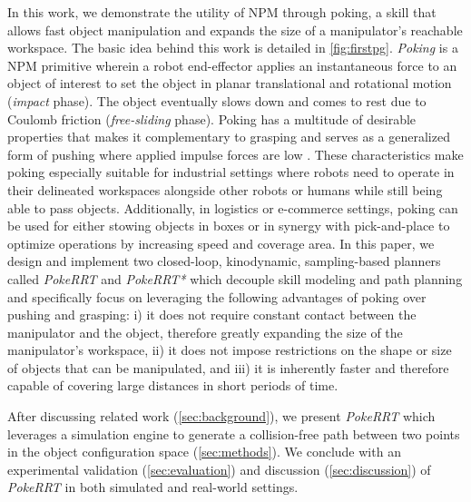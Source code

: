 In this work, we demonstrate the utility of NPM through poking, a skill that allows fast object manipulation and expands the size of a manipulator's reachable workspace. The basic idea behind this work is detailed in \cref{fig:firstpg}.
\textsl{Poking} is a NPM primitive wherein a robot end-effector applies an instantaneous force to an object of interest to set the object in planar translational and rotational motion (\textsl{impact} phase). The object eventually slows down and comes to rest due to Coulomb friction (\textsl{free-sliding} phase). Poking has a multitude of desirable properties that makes it complementary to grasping and serves as a generalized form of pushing where applied impulse forces are low \cite{Huang-1997-14452, pasricha2021pokerrt}. 
These characteristics make poking especially suitable for industrial settings where robots need to operate in their delineated workspaces alongside other robots or humans while still being able to pass objects. Additionally, in logistics or e-commerce settings, poking can be used for either stowing objects in boxes or in synergy with pick-and-place to optimize operations by increasing speed and coverage area.
In this paper, we design and implement two closed-loop, kinodynamic, sampling-based planners called \textsl{PokeRRT} and \textsl{PokeRRT*} which decouple skill modeling and path planning and specifically focus on leveraging the following advantages of poking over pushing and grasping:
i) it does not require constant contact between the manipulator and the object, therefore greatly expanding the size of the manipulator's workspace,
ii) it does not impose restrictions on the shape or size of objects that can be manipulated, and
iii) it is inherently faster and therefore capable of covering large distances in short periods of time.

After discussing related work (\cref{sec:background}), we present \textsl{PokeRRT} which leverages a simulation engine to generate a collision-free path between two points in the object configuration space (\cref{sec:methods}). We conclude with an experimental validation (\cref{sec:evaluation}) and discussion (\cref{sec:discussion}) of \textsl{PokeRRT} in both simulated and real-world settings.%
